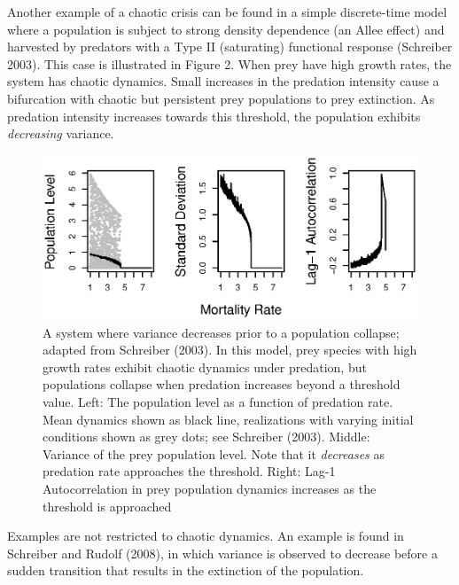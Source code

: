 \documentclass{article}
\begin{document}
Another example of a chaotic crisis can be found in a simple
discrete-time model where a population is subject to strong density
dependence (an Allee effect) and harvested by predators with a Type II
(saturating) functional response (Schreiber 2003). This case is
illustrated in Figure 2. When prey have high growth rates, the system
has chaotic dynamics. Small increases in the predation intensity cause a
bifurcation with chaotic but persistent prey populations to prey
extinction. As predation intensity increases towards this threshold, the
population exhibits \emph{decreasing} variance.

\begin{figure}[htbp]
\centering
\includegraphics{schreiber-fig.eps}
\caption{A system where variance decreases prior to a population
collapse; adapted from Schreiber (2003). In this model, prey species
with high growth rates exhibit chaotic dynamics under predation, but
populations collapse when predation increases beyond a threshold value.
Left: The population level as a function of predation rate. Mean
dynamics shown as black line, realizations with varying initial
conditions shown as grey dots; see Schreiber (2003). Middle: Variance of
the prey population level. Note that it \emph{decreases} as predation
rate approaches the threshold. Right: Lag-1 Autocorrelation in prey
population dynamics increases as the threshold is approached}
\end{figure}

Examples are not restricted to chaotic dynamics. An example is found in
Schreiber and Rudolf (2008), in which variance is observed to decrease
before a sudden transition that results in the extinction of the
population.
\end{document}
